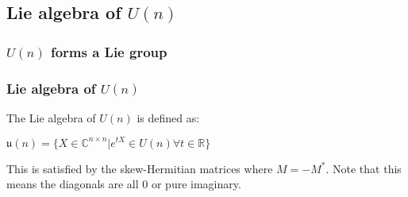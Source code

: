 

\subsection{Lie algebra of \(U(n)\)}

\subsubsection{\(U(n)\) forms a Lie group}

\subsubsection{Lie algebra of \(U(n)\)}

The Lie algebra of \(U(n)\) is defined as:

\(\mathfrak{u}(n)=\{X\in \mathbb {C}^{n\times n}|e^{tX}\in U(n) \forall t\in \mathbb{R}\}\)

This is satisfied by the skew-Hermitian matrices where \(M=-M^*\). Note that this means the diagonals are all \(0\) or pure imaginary.

